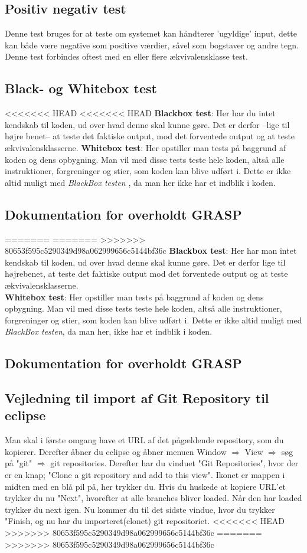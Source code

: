     \subsection{Positiv negativ test}
        Denne test bruges for at teste om systemet kan håndterer 'ugyldige' input, dette kan både være negative som positive værdier, såvel som bogstaver og andre tegn. Denne test forbindes oftest med en eller flere ækvivalensklasse test.
    \subsection{Black- og Whitebox test}
<<<<<<< HEAD
<<<<<<< HEAD
        \textbf{Blackbox test}: Her har du intet kendskab til koden, ud over hvad denne skal kunne gøre. Det er derfor --lige til højre benet-- at teste det faktiske output, mod det forventede output og at teste ækvivalensklasserne.
        \textbf{Whitebox test}: Her opstiller man tests på baggrund af koden og dens opbygning. Man vil med disse tests teste hele koden, altså alle instruktioner, forgreninger og stier, som koden kan blive udført i. Dette er ikke altid muligt med \textit{BlackBox testen} , da man her ikke har et indblik i koden.

\subsection{Dokumentation for overholdt GRASP}
=======
=======
>>>>>>> 80653f595c5290349d98a062999656c5144bf36c
        \textbf{Blackbox test}: Her har man intet kendskab til koden, ud over hvad denne skal kunne gøre. Det er derfor lige til højrebenet, at teste det faktiske output mod det forventede output og at teste ækvivalensklasserne.
        \\
        \textbf{Whitebox test}: Her opstiller man tests på baggrund af koden og dens opbygning. Man vil med disse tests teste hele koden, altså alle instruktioner, forgreninger og stier, som koden kan blive udført i. Dette er ikke altid muligt med \textit{BlackBox testen}, da man her, ikke har et indblik i koden.

\subsection{Dokumentation for overholdt GRASP}

\subsection{Vejledning til import af Git Repository til eclipse}
Man skal i første omgang have et URL af det pågældende repository, som du kopierer.
Derefter åbner du eclipse og åbner menuen 
Window $\Rightarrow$ View $\Rightarrow$ søg på "git" $\Rightarrow$ git repositories.
Derefter har du vinduet "Git Repositories", hvor der er en knap; "Clone a git repository and add to this view".
Ikonet er mappen i midten med en blå pil på, her trykker du.
Hvis du huskede at kopiere URL'et trykker du nu "Next", hvorefter at alle branches bliver loaded. Når den har loaded trykker du next igen.
Nu kommer du til det sidste vindue, hvor du trykker "Finish, og nu har du importeret(clonet) git repositoriet.
<<<<<<< HEAD
>>>>>>> 80653f595c5290349d98a062999656c5144bf36c
=======
>>>>>>> 80653f595c5290349d98a062999656c5144bf36c
